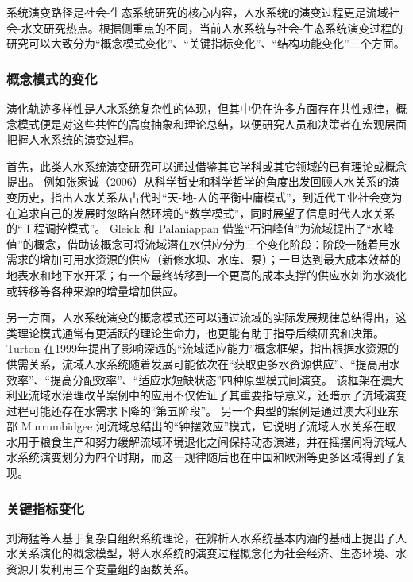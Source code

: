 系统演变路径是社会-生态系统研究的核心内容，人水系统的演变过程更是流域社会-水文研究热点。根据侧重点的不同，当前人水系统与社会-生态系统演变过程的研究可以大致分为“概念模式变化”、“关键指标变化”、“结构功能变化”三个方面。

\subsubsection*{概念模式的变化}

演化轨迹多样性是人水系统复杂性的体现，但其中仍在许多方面存在共性规律，概念模式便是对这些共性的高度抽象和理论总结，以便研究人员和决策者在宏观层面把握人水系统的演变过程。

首先，此类人水系统演变研究可以通过借鉴其它学科或其它领域的已有理论或概念提出。
例如张家诚（2006）从科学哲史和科学哲学的角度出发回顾人水关系的演变历史，指出人水关系从古代时“天-地-人的平衡中庸模式”，到近代工业社会变为在追求自己的发展时忽略自然环境的“数学模式”，同时展望了信息时代人水关系的“工程调控模式”\cite{zhang2006}。
Gleick 和 Palaniappan 借鉴“石油峰值”为流域提出了“水峰值”的概念，借助该概念可将流域潜在水供应分为三个变化阶段：阶段一随着用水需求的增加可用水资源的供应（新修水坝、水库、泵）；一旦达到最大成本效益的地表水和地下水开采；有一个最终转移到一个更高的成本支撑的供应水如海水淡化或转移等各种来源的增量增加供应\cite{gleick2010}。

另一方面，人水系统演变的概念模式还可以通过流域的实际发展规律总结得出，这类理论模式通常有更活跃的理论生命力，也更能有助于指导后续研究和决策。
Turton 在1999年提出了影响深远的“流域适应能力”概念框架，指出根据水资源的供需关系，流域人水系统随着发展可能依次在“获取更多水资源供应”、“提高用水效率”、“提高分配效率”、“适应水短缺状态”四种原型模式间演变\cite{turton1999}。
该框架在澳大利亚流域水治理改革案例中的应用不仅佐证了其重要指导意义，还暗示了流域演变过程可能还存在水需求下降的“第五阶段”\cite{loch2020}。
另一个典型的案例是通过澳大利亚东部 Murrumbidgee 河流域总结出的“钟摆效应”模式，它说明了流域人水关系在取水用于粮食生产和努力缓解流域环境退化之间保持动态演进，并在摇摆间将流域人水系统演变划分为四个时期\cite{kandasamy2014, roobavannan2017}，而这一规律随后也在中国和欧洲等更多区域得到了复现\cite{han2017, mostert2018}。

\subsubsection*{关键指标变化}

刘海猛等人基于复杂自组织系统理论，在辨析人水系统基本内涵的基础上提出了人水关系演化的概念模型，将人水系统的演变过程概念化为社会经济、生态环境、水资源开发利用三个变量组的函数关系\cite{liu2014}。

